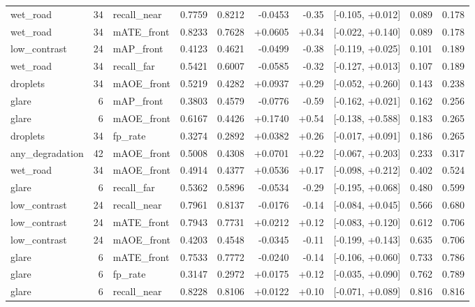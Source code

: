 \begin{longtable}{l r l r r r r l r l}
wet\_road & 34 & recall\_near & 0.7759 & 0.8212 & -0.0453 & -0.35 & [-0.105, +0.012] & 0.089 & 0.178\\
wet\_road & 34 & mATE\_front & 0.8233 & 0.7628 & +0.0605 & +0.34 & [-0.022, +0.140] & 0.089 & 0.178\\
low\_contrast & 24 & mAP\_front & 0.4123 & 0.4621 & -0.0499 & -0.38 & [-0.119, +0.025] & 0.101 & 0.189\\
wet\_road & 34 & recall\_far & 0.5421 & 0.6007 & -0.0585 & -0.32 & [-0.127, +0.013] & 0.107 & 0.189\\
droplets & 34 & mAOE\_front & 0.5219 & 0.4282 & +0.0937 & +0.29 & [-0.052, +0.260] & 0.143 & 0.238\\
glare & 6 & mAP\_front & 0.3803 & 0.4579 & -0.0776 & -0.59 & [-0.162, +0.021] & 0.162 & 0.256\\
glare & 6 & mAOE\_front & 0.6167 & 0.4426 & +0.1740 & +0.54 & [-0.138, +0.588] & 0.183 & 0.265\\
droplets & 34 & fp\_rate & 0.3274 & 0.2892 & +0.0382 & +0.26 & [-0.017, +0.091] & 0.186 & 0.265\\
any\_degradation & 42 & mAOE\_front & 0.5008 & 0.4308 & +0.0701 & +0.22 & [-0.067, +0.203] & 0.233 & 0.317\\
wet\_road & 34 & mAOE\_front & 0.4914 & 0.4377 & +0.0536 & +0.17 & [-0.098, +0.212] & 0.402 & 0.524\\
glare & 6 & recall\_far & 0.5362 & 0.5896 & -0.0534 & -0.29 & [-0.195, +0.068] & 0.480 & 0.599\\
low\_contrast & 24 & recall\_near & 0.7961 & 0.8137 & -0.0176 & -0.14 & [-0.084, +0.045] & 0.566 & 0.680\\
low\_contrast & 24 & mATE\_front & 0.7943 & 0.7731 & +0.0212 & +0.12 & [-0.083, +0.120] & 0.612 & 0.706\\
low\_contrast & 24 & mAOE\_front & 0.4203 & 0.4548 & -0.0345 & -0.11 & [-0.199, +0.143] & 0.635 & 0.706\\
glare & 6 & mATE\_front & 0.7533 & 0.7772 & -0.0240 & -0.14 & [-0.106, +0.060] & 0.733 & 0.786\\
glare & 6 & fp\_rate & 0.3147 & 0.2972 & +0.0175 & +0.12 & [-0.035, +0.090] & 0.762 & 0.789\\
glare & 6 & recall\_near & 0.8228 & 0.8106 & +0.0122 & +0.10 & [-0.071, +0.089] & 0.816 & 0.816\\
\end{longtable}
